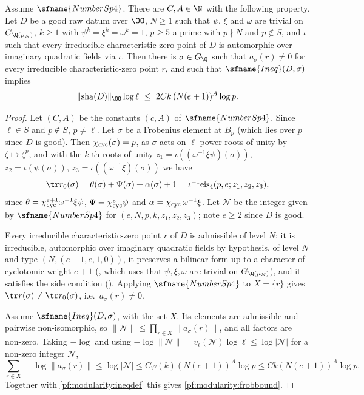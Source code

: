 \begin{proposition}\label{pf:modularity:frob}
Assume $\sfname{NumberSp4}$. There are $C,A\in\N$ with the following property. Let $D$ be a good raw datum over $\OO$,
$N\ge1$ such that $\psi$, $\xi$ and $\omega$ are trivial on $G_{\Q(\mu_N)}$, $k\ge1$ with $\psi^k=\xi^k=\omega^k=1$,
$p\ge5$ a prime with $p\nmid N$ and $p\notin S$, and $\iota$ such that every irreducible characteristic-zero point of $D$
is automorphic over imaginary quadratic fields via $\iota$. Then there is $\sigma\in G_\Q$ such that $a_\sigma(r)\ne0$ for
every irreducible characteristic-zero point $r$, and such that $\sfname{Ineq}(D,\sigma)$ implies
\begin{equation}\label{pf:modularity:frobbound}
\|\modularitySha(D)\|_\OO\log\ell\ \le\ 2Ck\,(N(e+1))^A\log p.
\end{equation}
\end{proposition}

\begin{proof}
Let $(C,A)$ be the constants $(c,A)$ of $\sfname{NumberSp4}$. Since $\ell\in S$ and $p\notin S$, $p\ne\ell$. Let
$\sigma$ be a Frobenius element at $B_p$ (which lies over $p$ since $D$ is good). Then $\chi_{\mathrm{cyc}}(\sigma)=p$, as
$\sigma$ acts on $\ell$-power roots of unity by $\zeta\mapsto\zeta^p$, and with the $k$-th roots of unity
$z_1=\iota((\omega^{-1}\xi\psi)(\sigma))$, $z_2=\iota(\psi(\sigma))$, $z_3=\iota((\omega^{-1}\xi)(\sigma))$ we have
\[
 \tr r_0(\sigma)=\theta(\sigma)+\Psi(\sigma)+\alpha(\sigma)+1=\iota^{-1}\mathrm{eis}_4(p,e;z_1,z_2,z_3),
\]
since $\theta=\chi_{\mathrm{cyc}}^{e+1}\omega^{-1}\xi\psi$, $\Psi=\chi_{\mathrm{cyc}}^e\psi$ and $\alpha=\chi_{\mathrm{cyc}}\,\omega^{-1}\xi$.
Let $\mathcal N$ be the integer given by $\sfname{NumberSp4}$ for $(e,N,p,k,z_1,z_2,z_3)$; note $e\ge2$ since $D$ is
good.

Every irreducible characteristic-zero point $r$ of $D$ is admissible of level $N$: it is irreducible, automorphic over
imaginary quadratic fields by hypothesis, of level $N$ and type $(N,(e+1,e,1,0))$, it preserves a bilinear form up to a
character of cyclotomic weight $e+1$ (, which uses that
$\psi,\xi,\omega$ are trivial on $G_{\Q(\mu_N)}$), and it satisfies the side condition
(). Applying $\sfname{NumberSp4}$ to $X=\{r\}$ gives
$\tr r(\sigma)\ne\tr r_0(\sigma)$, i.e.\ $a_\sigma(r)\ne0$.

Assume $\sfname{Ineq}(D,\sigma)$, with the set $X$. Its elements are admissible and pairwise non-isomorphic, so
$\|\mathcal N\|\le\prod_{r\in X}\|a_\sigma(r)\|$, and all factors are non-zero. Taking $-\log$ and using
$-\log\|\mathcal N\|=v_\ell(\mathcal N)\log\ell\le\log|\mathcal N|$ for a non-zero integer $\mathcal N$,
\[
 \sum_{r\in X}-\log\|a_\sigma(r)\|\le\log|\mathcal N|\le C\varphi(k)(N(e+1))^A\log p\le Ck(N(e+1))^A\log p .
\]
Together with \eqref{pf:modularity:ineqdef} this gives \eqref{pf:modularity:frobbound}.
\end{proof}

